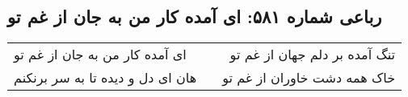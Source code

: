\begin{center}
\section*{رباعی شماره ۵۸۱: ای آمده کار من به جان از غم تو}
\label{sec:sh581}
\begin{longtable}{l p{0.5cm} r}
ای آمده کار من به جان از غم تو
&&
تنگ آمده بر دلم جهان از غم تو
\\
هان ای دل و دیده تا به سر برنکنم
&&
خاک همه دشت خاوران از غم تو
\\
\end{longtable}
\end{center}
